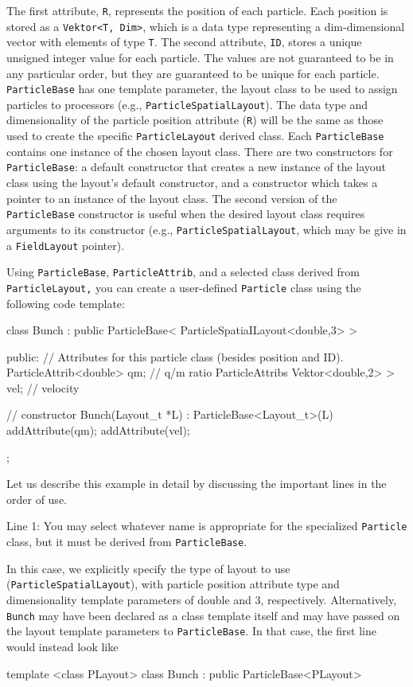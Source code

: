 The first attribute, \texttt{R}, represents the position of each particle. Each position is stored as a \texttt{Vektor<T, Dim>}, which is a \ippl data type representing a dim-dimensional vector with elements of type \texttt{T}. The second attribute, \texttt{ID}, stores a unique unsigned integer value for each particle. The values are not guaranteed to be in any particular order, but they are guaranteed to be unique for each particle. \texttt{ParticleBase} has one template parameter, the layout class to be used to assign particles
to processors (e.g., \texttt{ParticleSpatialLayout}). The data type and dimensionality of the particle position attribute (\texttt{R}) will be the same as those used to create the specific \texttt{ParticleLayout} derived class. Each \texttt{ParticleBase} contains one instance of the chosen layout class. There are two constructors for \texttt{ParticleBase}: a default constructor that creates a new instance of the layout class using the layout's default constructor, and a constructor which takes a pointer to an instance of the
layout class. The second version of the \texttt{ParticleBase} constructor is useful when the desired layout class requires arguments to its constructor (e.g., \texttt{ParticleSpatialLayout}, which may be give in a \texttt{FieldLayout} pointer).

Using \texttt{ParticleBase}, \texttt{ParticleAttrib}, and a selected class derived from \texttt{ParticleLayout,} you can create a user-defined \texttt{Particle} class using the following code template: \\
\clearpage
\begin{codeln}
class Bunch : public ParticleBase< ParticleSpatiaILayout<double,3> > 
{ 
public: 
    // Attributes for this particle class (besides position and ID). 
    ParticleAttrib<double>             qm;      // q/m ratio 
    ParticleAttribs Vektor<double,2> > vel; 	// velocity 

    // constructor 
    Bunch(Layout\_t *L) : ParticleBase<Layout\_t>(L) { 
        addAttribute(qm); 
        addAttribute(vel); 
    } 
}; 
\end{codeln}

Let us describe this example in detail by discussing the important lines in the order of use.

Line 1: You may select whatever name is appropriate for the specialized \texttt{Particle} class, but it must be derived from \texttt{ParticleBase}. 

In this case, we explicitly specify the type of layout to use (\texttt{ParticleSpatialLayout}), with particle position attribute type and dimensionality template parameters of double and 3, respectively. Alternatively, \texttt{Bunch} may have been declared as a class template itself and may have passed on the layout template parameters to \texttt{ParticleBase}. In that case, the first line would instead look like
\begin{smallcode}
template <class PLayout> 
class Bunch : public ParticleBase<PLayout> 
\end{smallcode}

